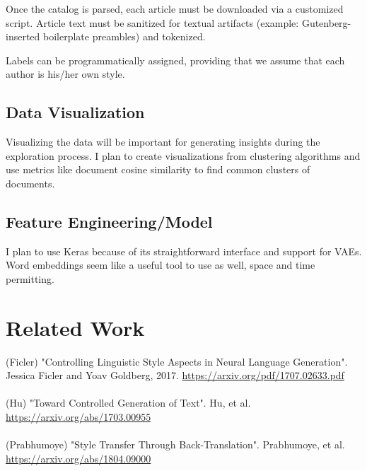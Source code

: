 \documentclass[11pt]{article}
\begin{document}
Once the catalog is parsed, each article must be downloaded via a customized script. Article text must be sanitized for textual artifacts (example: Gutenberg-inserted boilerplate preambles) and tokenized.

Labels can be programmatically assigned, providing that we assume that each author is his/her own style.

\subsection{Data Visualization}
Visualizing the data will be important for generating insights during the exploration process. I plan to create visualizations from clustering algorithms and use metrics like document cosine similarity to find common clusters of documents.

\subsection{Feature Engineering/Model}
I plan to use Keras because of its straightforward interface and support for VAEs. Word embeddings seem like a useful tool to use as well, space and time permitting.


\section{Related Work}

(Ficler) "Controlling Linguistic Style Aspects in Neural Language Generation". Jessica Ficler and Yoav Goldberg, 2017. \url{https://arxiv.org/pdf/1707.02633.pdf}\\ \\
(Hu) "Toward Controlled Generation of Text". Hu, et al. \url{https://arxiv.org/abs/1703.00955}
\\ \\
(Prabhumoye) "Style Transfer Through Back-Translation". Prabhumoye, et al. \url{https://arxiv.org/abs/1804.09000}
\end{document}
